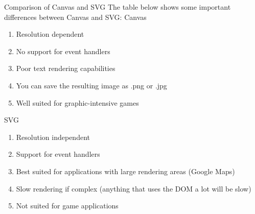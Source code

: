 Comparison of Canvas and SVG
The table below shows some important differences between Canvas and SVG:
Canvas

\begin{enumerate}
\item	Resolution dependent
\item	No support for event handlers
\item	Poor text rendering capabilities
\item	You can save the resulting image as .png or .jpg
\item	Well suited for graphic-intensive games
\end{enumerate}	
SVG

\begin{enumerate}
\item	Resolution independent
\item	Support for event handlers
\item	Best suited for applications with large rendering areas (Google Maps)
\item	Slow rendering if complex (anything that uses the DOM a lot will be slow)
\item	Not suited for game applications
\end{enumerate}
